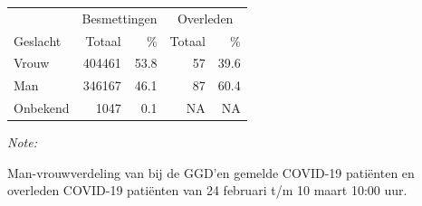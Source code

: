 \documentclass[
  english,
  man,floatsintext]{apa6}
\begin{document}
\newpage

\begin{table}
\centering\begingroup\fontsize{11}{13}\selectfont

\begin{threeparttable}
\begin{tabular}{lrrrr}
\toprule
\multicolumn{1}{c}{ } & \multicolumn{2}{c}{Besmettingen} & \multicolumn{2}{c}{Overleden} \\
\cmidrule(l{3pt}r{3pt}){2-3} \cmidrule(l{3pt}r{3pt}){4-5}
Geslacht & Totaal & \% & Totaal & \%\\
\midrule
Vrouw & 404461 & 53.8 & 57 & 39.6\\
Man & 346167 & 46.1 & 87 & 60.4\\
Onbekend & 1047 & 0.1 & NA & NA\\
\bottomrule
\end{tabular}
\begin{tablenotes}
\item \textit{Note: } 
\item Man-vrouwverdeling van bij de GGD’en gemelde COVID-19 patiënten en overleden COVID-19 patiënten van 24 februari t/m 10 maart 10:00 uur.
\end{tablenotes}
\end{threeparttable}
\endgroup{}
\end{table}
\newpage
\end{document}
